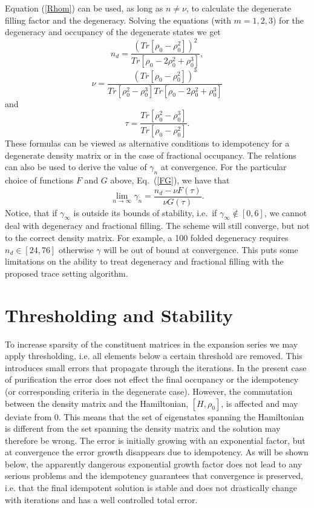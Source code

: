 Equation (\ref{Rhom}) can be used, as long as
$n \neq \nu$, to calculate the degenerate filling factor and the degeneracy.
Solving the equations (with $m=1,2,3$) for the degeneracy and occupancy
of the degenerate states we get
\begin{equation}
n_d = \frac{(Tr [\rho_0-\rho_0^2 ])^2}{Tr [\rho_0-2\rho_0^2+\rho_0^3 ]},
\end{equation}
\begin{equation}
\nu = \frac{(Tr [\rho_0-\rho_0^2 ])^3}{Tr [\rho_0^2-\rho_0^3 ]Tr [\rho_0-2\rho_0^2+\rho_0^3 ]}
\end{equation}
and
\begin{equation}
\tau = \frac{Tr [\rho_0^2-\rho_0^3 ]}{Tr [\rho_0-\rho_0^2 ]}.
\end{equation}
These formulas can be viewed as alternative conditions to idempotency
for a degenerate density matrix or in the case of fractional occupancy. 
The relations can also be used
to derive the value of $\gamma_n$ at convergence. For the particular
choice of functions $F$ and $G$ above, Eq.\ (\ref{FG}), we have that
\begin{equation}
\lim_{n \rightarrow \infty} \gamma_n = \frac{n_d - \nu F(\tau )}
                                               {\nu G(\tau )}.
\end{equation}
Notice, that if $\gamma_{\infty}$
is outside its bounds of stability, i.e.\ if $\gamma_{\infty} \notin [0,6]$, we cannot deal with
degeneracy and fractional filling. The scheme will still
converge, but not to the correct density matrix. For example,
a 100 folded degeneracy requires $n_d \in [24,76]$ otherwise
$\gamma$ will be out of bound at convergence. This puts some
limitations on the ability to treat degeneracy and fractional filling
with the proposed trace setting algorithm.


\section{Thresholding and Stability}

To increase sparsity of the constituent matrices in the expansion series
we may apply thresholding, i.e. all elements below a certain threshold
are removed. This introduces small errors that propagate through the
iterations. In the present case of purification the error does not
effect the final occupancy or the idempotency (or corresponding criteria
in the degenerate case). However, the commutation between the density
matrix and the Hamiltonian, $[H,\rho_0]$, is affected and may deviate from $0$. 
This means that the set of eigenstates spanning the Hamiltonian is different 
from the set spanning the density matrix and the solution may therefore be wrong.
The error is initially growing with an exponential factor, but at convergence
the error growth disappears due to idempotency.
As will be shown below, the apparently dangerous exponential 
growth factor does not lead to any serious problems and the idempotency
guarantees that convergence is preserved, i.e. that the final 
idempotent solution is stable and does not drastically change 
with iterations and has a well controlled total error.

